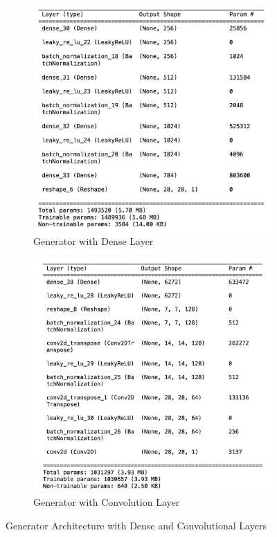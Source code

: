 \begin{figure}[H]
    \centering
    \begin{subfigure}[b]{0.45\linewidth}
        \centering
        \includegraphics[width=\linewidth]{./Images/generator_dense.jpg}
        \caption{Generator with Dense Layer}
        \label{fig:gen_dense}
    \end{subfigure}
    \hspace{0.05\linewidth}
    \begin{subfigure}[b]{0.45\linewidth}
        \centering
        \includegraphics[width=\linewidth]{./Images/generator_cnn.jpg}
        \caption{Generator with Convolution Layer}
        \label{fig:gen_conv}
    \end{subfigure}
    \caption{Generator Architecture with Dense and Convolutional Layers}
    \label{fig:gen_architecture}
\end{figure}


